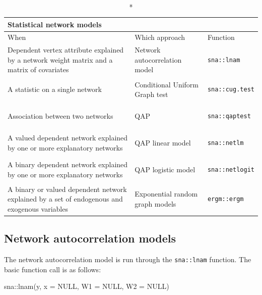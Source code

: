 \documentclass[
]{article}
\newenvironment{Shaded}{\begin{snugshade}}{\end{snugshade}}
\newcommand{\AttributeTok}[1]{\textcolor[rgb]{0.77,0.63,0.00}{#1}}
\newcommand{\ConstantTok}[1]{\textcolor[rgb]{0.00,0.00,0.00}{#1}}
\newcommand{\FunctionTok}[1]{\textcolor[rgb]{0.00,0.00,0.00}{#1}}
\newcommand{\NormalTok}[1]{#1}
\newcommand{\SpecialCharTok}[1]{\textcolor[rgb]{0.00,0.00,0.00}{#1}}
\begin{document}
\captionsetup[table]{labelformat=empty,skip=1pt}
\begin{longtable}{lll}
\caption*{
{\large Statistical network models}
} \\ 
\toprule
When & Which approach & Function \\ 
\midrule
Dependent vertex attribute explained by a network weight matrix and a matrix of covariates & Network autocorrelation model & \begin{verbatim}
sna::lnam
\end{verbatim} \\ 
A statistic on a single network & Conditional Uniform Graph test & \begin{verbatim}
sna::cug.test
\end{verbatim} \\ 
Association between two networks & QAP & \begin{verbatim}
sna::qaptest
\end{verbatim} \\ 
A valued dependent network explained by one or more explanatory networks & QAP linear model & \begin{verbatim}
sna::netlm
\end{verbatim} \\ 
A binary dependent network explained by one or more explanatory networks & QAP logistic model & \begin{verbatim}
sna::netlogit
\end{verbatim} \\ 
A binary or valued dependent network explained by a set of endogenous and exogenous variables & Exponential random graph models & \begin{verbatim}
ergm::ergm
\end{verbatim} \\ 
\bottomrule
\end{longtable}

\hypertarget{network-autocorrelation-models}{%
\subsection{Network autocorrelation
models}\label{network-autocorrelation-models}}

The network autocorrelation model is run through the \texttt{sna::lnam}
function. The basic function call is as follows:

\begin{Shaded}
\begin{Highlighting}[]
\NormalTok{sna}\SpecialCharTok{::}\FunctionTok{lnam}\NormalTok{(y, }\AttributeTok{x =} \ConstantTok{NULL}\NormalTok{, }\AttributeTok{W1 =} \ConstantTok{NULL}\NormalTok{, }\AttributeTok{W2 =} \ConstantTok{NULL}\NormalTok{)}
\end{Highlighting}
\end{Shaded}
\end{document}
